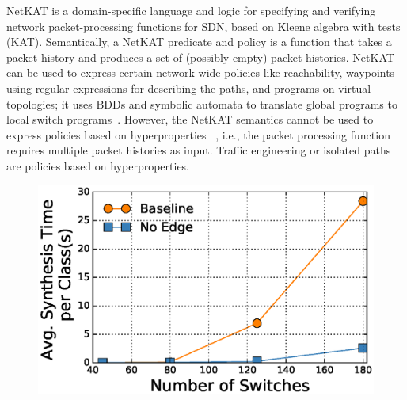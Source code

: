 NetKAT is a domain-specific language and logic for 
specifying and verifying network packet-processing functions
for SDN, based on Kleene algebra with tests (KAT). Semantically,
a NetKAT predicate and policy is a function that takes a packet
history and produces a set of (possibly empty) packet histories. 
NetKAT can be used to express certain network-wide policies like 
reachability, waypoints using regular expressions for describing the paths, 
and programs on virtual topologies; it uses
BDDs and symbolic automata to translate global programs to local
switch programs~\cite{netkatcompiler}. 
However, the NetKAT semantics
cannot be used to express policies based on hyperproperties
~\cite{hyperproperties}, i.e., 
the packet processing function requires multiple packet histories
as input. Traffic engineering or isolated paths are policies
based on hyperproperties. 
\begin{figure}[t]
	\centering
	\includegraphics[width=0.65\columnwidth]{figures/linkTopology.eps}
	\label{fig:link-capacity}
\end{figure}


